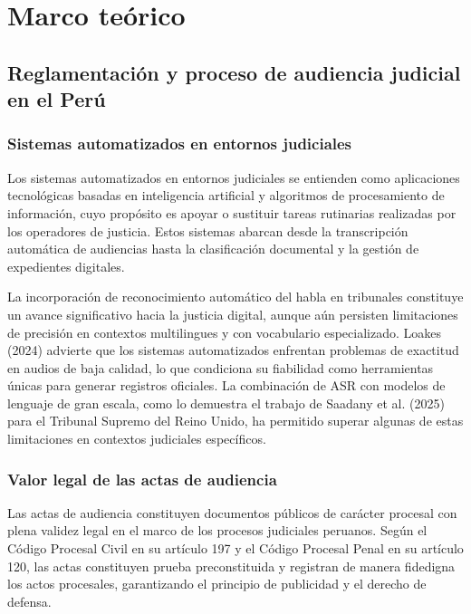 \documentclass[12pt,a4paper,oneside]{article}
\begin{document}
\section{Marco te\'orico}

\subsection{Reglamentaci\'on y proceso de audiencia judicial en el Per\'u}

\subsubsection{Sistemas automatizados en entornos judiciales}

Los sistemas automatizados en entornos judiciales se entienden como aplicaciones tecnol\'ogicas basadas en inteligencia artificial y algoritmos de procesamiento de informaci\'on, cuyo prop\'osito es apoyar o sustituir tareas rutinarias realizadas por los operadores de justicia. Estos sistemas abarcan desde la transcripci\'on autom\'atica de audiencias hasta la clasificaci\'on documental y la gesti\'on de expedientes digitales.

La incorporaci\'on de reconocimiento autom\'atico del habla en tribunales constituye un avance significativo hacia la justicia digital, aunque a\'un persisten limitaciones de precisi\'on en contextos multilingues y con vocabulario especializado. Loakes (2024) advierte que los sistemas automatizados enfrentan problemas de exactitud en audios de baja calidad, lo que condiciona su fiabilidad como herramientas \'unicas para generar registros oficiales. La combinaci\'on de ASR con modelos de lenguaje de gran escala, como lo demuestra el trabajo de Saadany et al. (2025) para el Tribunal Supremo del Reino Unido, ha permitido superar algunas de estas limitaciones en contextos judiciales espec\'ificos.

\subsubsection{Valor legal de las actas de audiencia}

Las actas de audiencia constituyen documentos p\'ublicos de car\'acter procesal con plena validez legal en el marco de los procesos judiciales peruanos. Seg\'un el C\'odigo Procesal Civil en su art\'iculo 197 y el C\'odigo Procesal Penal en su art\'iculo 120, las actas constituyen prueba preconstituida y registran de manera fidedigna los actos procesales, garantizando el principio de publicidad y el derecho de defensa.
\end{document}
